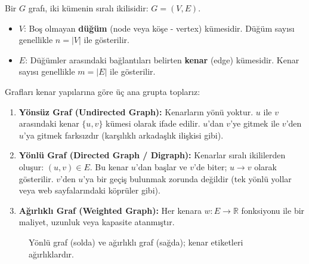 \begin{definition}[Graf]
Bir $G$ grafı, iki kümenin sıralı ikilisidir: $G = (V, E)$.
\begin{itemize}
    \item $V$: Boş olmayan \textbf{düğüm} (node veya köşe - vertex) kümesidir. Düğüm sayısı genellikle $n = |V|$ ile gösterilir.
    \item $E$: Düğümler arasındaki bağlantıları belirten \textbf{kenar} (edge) kümesidir. Kenar sayısı genellikle $m = |E|$ ile gösterilir.
\end{itemize}
\end{definition}

Grafları kenar yapılarına göre üç ana grupta toplarız:
\begin{enumerate}
    \item \textbf{Yönsüz Graf (Undirected Graph):} Kenarların yönü yoktur. $u$ ile $v$ arasındaki kenar $\{u, v\}$ kümesi olarak ifade edilir. $u$'dan $v$'ye gitmek ile $v$'den $u$'ya gitmek farksızdır (karşılıklı arkadaşlık ilişkisi gibi).
    \item \textbf{Yönlü Graf (Directed Graph / Digraph):} Kenarlar sıralı ikililerden oluşur: $(u, v) \in E$. Bu kenar $u$'dan başlar ve $v$'de biter; $u \to v$ olarak gösterilir. $v$'den $u$'ya bir geçiş bulunmak zorunda değildir (tek yönlü yollar veya web sayfalarındaki köprüler gibi).
    \item \textbf{Ağırlıklı Graf (Weighted Graph):} Her kenara $w: E \to \mathbb{R}$ fonksiyonu ile bir maliyet, uzunluk veya kapasite atanmıştır.
\end{enumerate}

\begin{figure}[ht]
\centering
{}
\hspace{1.1cm}
\caption{Yönlü graf (solda) ve ağırlıklı graf (sağda); kenar etiketleri ağırlıklardır.}
\end{figure}

